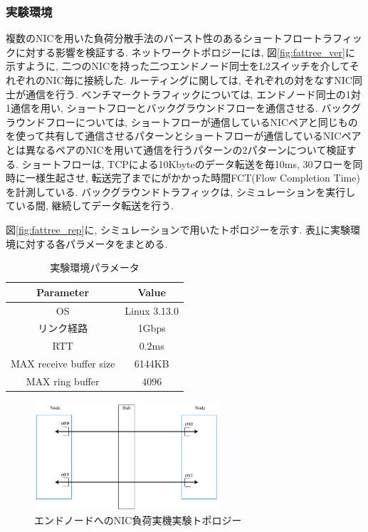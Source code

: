\documentclass[11pt, a4paper, twocolumn]{jsarticle}
\begin{document}
\subsubsection{実験環境}
複数のNICを用いた負荷分散手法のバースト性のあるショートフロートラフィックに対する影響を検証する.
ネットワークトポロジーには,
図\ref{fig:fattree_ver}に示すように, 二つのNICを持った二つエンドノード同士をL2スイッチを介してそれぞれのNIC毎に接続した.
ルーティングに関しては, それぞれの対をなすNIC同士が通信を行う.
ベンチマークトラフィックについては, エンドノード同士の1対1通信を用い, ショートフローとバックグラウンドフローを通信させる.
バックグラウンドフローについては,
ショートフローが通信しているNICペアと同じものを使って共有して通信させるパターンとショートフローが通信しているNICペアとは異なるペアのNICを用いて通信を行うパターンの2パターンについて検証する.
ショートフローは, TCPによる10Kbyteのデータ転送を毎10ms, 30フローを同時に一様生起させ, 転送完了までにがかかった時間FCT(Flow
Completion Time)を計測している.
バックグラウンドトラフィックは, シミュレーションを実行している間, 継続してデータ転送を行う.

図\ref{fig:fattree_rep}に, シミュレーションで用いたトポロジーを示す.
表\ref{table:experiment_ver}に実験環境に対する各パラメータをまとめる.
\begin{table}[h]
\begin{center}
\footnotesize
\begin{tabular}{c|c}
\hline
Parameter & Value \\ \hline \hline
OS & Linux 3.13.0 \\
リンク経路 & 1Gbps \\
RTT & 0.2ms\\
MAX receive buffer size & 6144KB \\
MAX ring buffer & 4096 \\
\hline
\end{tabular}
\caption{実験環境パラメータ}
\label{table:experiment_ver}
\end{center}
\end{table}

\begin{figure}[h]
    \begin{center}
    \includegraphics[autoebb, width=195pt]{./img/topology_real.pdf}
    \caption{エンドノードへのNIC負荷実機実験トポロジー}
    \label{fig:topology_real}
    \end{center}
\end{figure}
\end{document}
